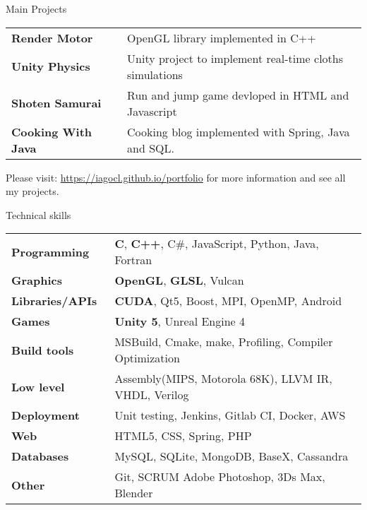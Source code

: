 \documentclass{resume} %
\begin{document}
\begin{mainSection}{Main Projects}

\begin{tabular}{ @{} >{\bfseries}l @{\hspace{6ex}} l }
Render Motor \ & OpenGL library implemented in C++ \\
Unity Physics \ & Unity project to implement real-time cloths simulations \\
Shoten Samurai \ & Run and jump game devloped in HTML and Javascript\\
Cooking With Java \ & Cooking blog implemented with Spring, Java and SQL. \\
\end{tabular}

Please visit: \url{https://iagocl.github.io/portfolio} for more information and see all my projects.
\end{mainSection}

\begin{mainSection}{Technical skills}

\begin{tabular}{ @{} >{\bfseries}l @{\hspace{4ex}} l }
Programming\ & \textbf{C}, \textbf{C++},  C\#,  JavaScript, Python, Java, Fortran \\
Graphics \ & \textbf{OpenGL}, \textbf{GLSL}, Vulcan \\
Libraries/APIs\ & \textbf{CUDA}, Qt5, Boost, MPI, OpenMP, Android \\
Games \ & \textbf{Unity 5}, Unreal Engine 4 \\
Build tools\ & MSBuild, Cmake, make, Profiling, Compiler Optimization \\
Low level \ & Assembly(MIPS, Motorola 68K), LLVM IR, VHDL, Verilog\\
Deployment \ & Unit testing, Jenkins, Gitlab CI, Docker, AWS \\
Web \ &  HTML5, CSS, Spring, PHP \\
Databases \ & MySQL, SQLite, MongoDB, BaseX, Cassandra \\
Other \ &  Git, SCRUM Adobe Photoshop, 3Ds Max, Blender
\end{tabular}
\end{mainSection}
\end{document}
